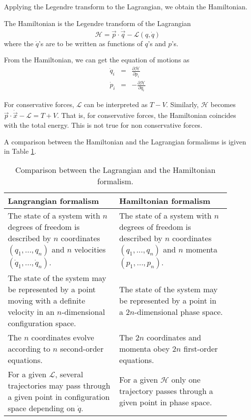 \documentclass[11pt,fleqn]{book} %
\begin{document}
Applying the Legendre transform to the Lagrangian, we obtain the Hamiltonian.
\begin{definition}[Hamiltonian]
    The Hamiltonian is the Legendre transform of the Lagrangian
    \begin{equation*}
        \mathcal{H} = \vec{p}\cdot\dot{\vec{q}}-\mathcal{L}(q, \dot q)
    \end{equation*}
where the $\dot{q}$'s are to be written as functions of $q$'s and $p$'s.
\end{definition}
From the Hamiltonian, we can get the equation of motions as
\begin{eqnarray*}
    \dot{q}_i &=& \frac{\partial\mathcal{H}}{\partial p_i} \\
    \dot{p}_i &=& -\frac{\partial\mathcal{H}}{\partial q_i}
\end{eqnarray*}

\begin{remark}
    For conservative forces, $\mathcal{L}$ can be interpreted as $T-V$. Similarly, $\mathcal{H}$ becomes
    $\vec{p}\cdot\dot{\vec{x}} - \mathcal{L} = T+V$. That is, for conservative forces, the Hamiltonian 
    coincides with the total energy. This is not true for non conservative forces.
\end{remark}

A comparison between the Hamiltonian and the Lagrangian formalisms is igiven in Table \ref{tab:lagrange_vs_hamilton}.

\begin{table}[ht]
    \centering
    \begin{tabular}{p{0.45\linewidth} | p{0.45\linewidth}}
    \hline
    Langrangian formalism & Hamiltonian formalism \\ 
    \hline
    The state of a system with $n$ degrees of freedom is described by $n$ coordinates $(q_1,..., q_n)$ and $n$ velocities
    $(\dot{q}_1,...,\dot{q}_n)$.
    &
    The state of a system with $n$ degrees of freedom is described by $n$ coordinates $(q_1,..., q_n)$ and $n$ momenta $(p_1,..., p_n)$.
    \\\hline
    The state of the system may be represented by a point moving with a definite velocity in an $n$-dimensional configuration space.
    &
    The state of the system may be represented by a point in a $2n$-dimensional phase space.
    \\\hline
    The $n$ coordinates evolve according to $n$ second-order equations.
    &
    The $2n$ coordinates and momenta obey $2n$ first-order equations.
    \\\hline
    For a given $\mathcal{L}$, several trajectories may pass through a given point in configuration space depending on $\dot{q}$.
    &
    For a given $\mathcal{H}$ only one trajectory passes through a given point in phase space.
    \\\hline
    \end{tabular}
    \caption{Comparison between the Lagrangian and the Hamiltonian formalism.}
    \label{tab:lagrange_vs_hamilton}
\end{table}
\end{document}
